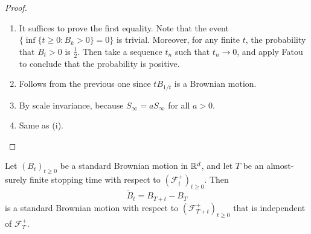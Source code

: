\documentclass[a4paper]{article}
\begin{document}
\begin{proof}\leavevmode
  \begin{enumerate}
    \item It suffices to prove the first equality. Note that the event $\{\inf \{t \geq 0: B_k > 0\} = 0\}$ is trivial. Moreover, for any finite $t$, the probability that $B_t > 0$ is $\frac{1}{2}$. Then take a sequence $t_n$ such that $t_n \to 0$, and apply Fatou to conclude that the probability is positive.
    \item Follows from the previous one since $t B_{1/t}$ is a Brownian motion.
    \item By scale invariance, because $S_\infty = a S_\infty$ for all $a > 0$.
    \item Same as (i).\qedhere
  \end{enumerate}
\end{proof}

\begin{thm}
  Let $(B_t)_{t \geq 0}$ be a standard Brownian motion in $\mathbb{R}^d$, and let $T$ be an almost-surely finite stopping time with respect to $(\mathcal{F}_t^+)_{t \geq 0}$. Then
  \[
    \tilde{B}_t = B_{T + t} - B_T
  \]
  is a standard Brownian motion with respect to $(\mathcal{F}_{T + t}^ +)_{t \geq 0}$ that is independent of $\mathcal{F}_T^+$.
\end{thm}
\end{document}

